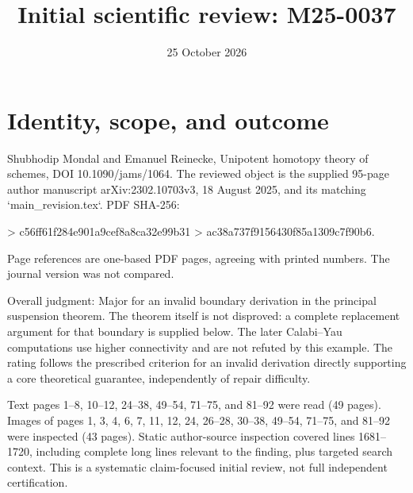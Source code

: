 \documentclass[10pt]{article}
\title{Initial scientific review: M25-0037}
\author{}
\date{25 October 2026}
\begin{document}
\maketitle
\section*{Identity, scope, and outcome}
Shubhodip Mondal and Emanuel Reinecke, Unipotent homotopy theory of schemes, DOI 10.1090/jams/1064. The reviewed object is the supplied 95-page author manuscript arXiv:2302.10703v3, 18 August 2025, and its matching `main\_revision.tex`. PDF SHA-256:\par
> c56ff61f284e901a9cef8a8ca32e99b31
> ac38a737f9156430f85a1309c7f90b6.\par
Page references are one-based PDF pages, agreeing with printed numbers. The journal version was not compared.\par
Overall judgment: Major for an invalid boundary derivation in the principal suspension theorem. The theorem itself is not disproved: a complete replacement argument for that boundary is supplied below. The later Calabi–Yau computations use higher connectivity and are not refuted by this example. The rating follows the prescribed criterion for an invalid derivation directly supporting a core theoretical guarantee, independently of repair difficulty.\par
Text pages 1–8, 10–12, 24–38, 49–54, 71–75, and 81–92 were read (49 pages). Images of pages 1, 3, 4, 6, 7, 11, 12, 24, 26–28, 30–38, 49–54, 71–75, and 81–92 were inspected (43 pages). Static author-source inspection covered lines 1681–1720, including complete long lines relevant to the finding, plus targeted search context. This is a systematic claim-focused initial review, not full independent certification.\par
\end{document}

